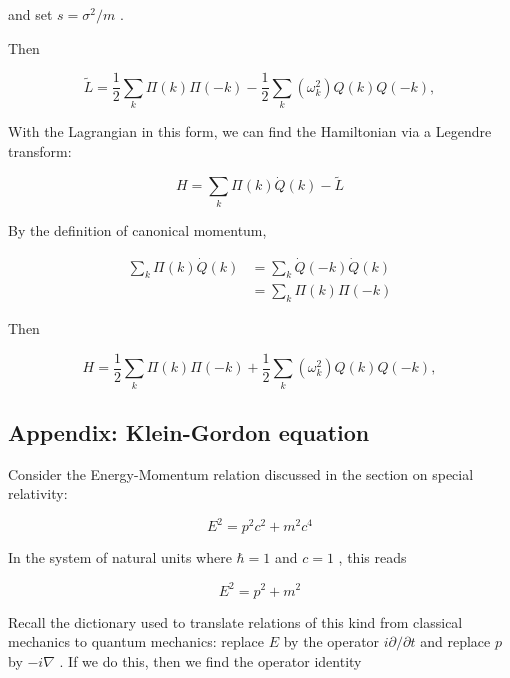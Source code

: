 and   set   $s = \sigma^2/m$ .



Then



\begin{equation}
\tilde L = \frac{1}{2} \sum_k \Pi (k) \Pi (-k) 
-  \frac{1}{2} \sum_k (\omega_k^2 )Q(k) Q(-k),
\end{equation}


With  the  Lagrangian  in  this  form,  we  can  find  the  Hamiltonian  via  a  Legendre  transform:



\begin{equation}
H = \sum_k \Pi(k)\dot Q(k) - \tilde L
\end{equation}


By  the  definition  of  canonical  momentum,



\begin{align}
\sum_k \Pi(k)\dot Q(k) &= \sum_k \dot Q(-k)\dot Q(k) \\
&=\sum_k \Pi(k)\Pi(-k)
\end{align}


Then



\begin{equation}
H = \frac{1}{2} \sum_k \Pi(k) \Pi (-k) 
+  \frac{1}{2} \sum_k  (\omega_k^2) Q(k) Q(-k),
\end{equation}


 \subsection{Appendix:  Klein-Gordon  equation}

Consider  the  Energy-Momentum  relation  discussed  in  the  section  on  special  relativity:



\begin{equation}
E^2 = p^2 c^2 + m^2 c^4
\end{equation}


In  the  system  of  natural  units  where   $\hbar = 1$  and   $c = 1$ ,  this  reads



\begin{equation}
\label{kg-energy-momentum-relation}
E^2 = p^2 + m^2
\end{equation}


Recall  the  dictionary  used  to  translate  relations  of  this  kind  from  classical  mechanics  to  quantum  mechanics:  replace   $E$  by  the  operator   $i\partial/\partial t$  and  replace   $p$  by   $-i\nabla$ .   If  we  do  this,  then  we  find  the  operator  identity



